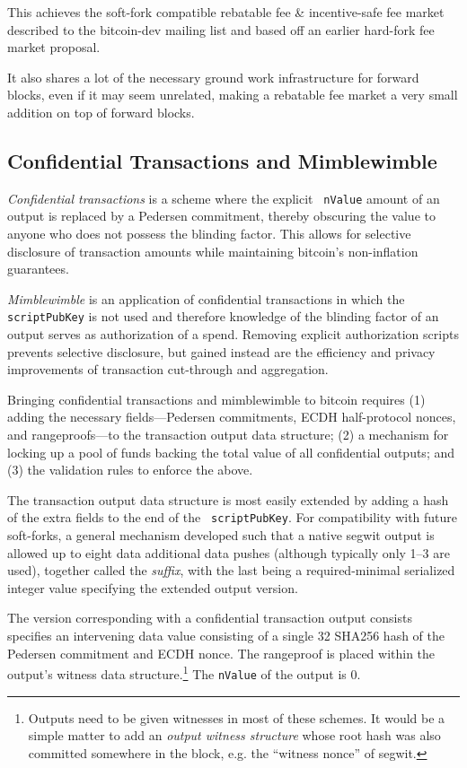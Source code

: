 This achieves the soft-fork compatible rebatable fee \& incentive-safe
fee market described to the bitcoin-dev mailing list\cite{rebatefeeml}
and based off an earlier hard-fork fee market
proposal\cite{rebatefeehf}.

It also shares a lot of the necessary ground work infrastructure for
forward blocks, even if it may seem unrelated, making a rebatable fee
market a very small addition on top of forward blocks.

\subsection{Confidential Transactions and Mimblewimble} \label{confidentialtx}

\emph{Confidential transactions} is a scheme where the explicit {\tt
  nValue} amount of an output is replaced by a Pedersen commitment,
thereby obscuring the value to anyone who does not possess the
blinding factor.  This allows for selective disclosure of transaction
amounts while maintaining bitcoin's non-inflation guarantees.

\emph{Mimblewimble} is an application of confidential transactions in
which the {\tt scriptPubKey} is not used and therefore knowledge of
the blinding factor of an output serves as authorization of a spend.
Removing explicit authorization scripts prevents selective disclosure,
but gained instead are the efficiency and privacy improvements of
transaction cut-through and aggregation.

Bringing confidential transactions and mimblewimble to bitcoin
requires (1) adding the necessary fields---Pedersen commitments, ECDH
half-protocol nonces, and rangeproofs---to the transaction output data
structure; (2) a mechanism for locking up a pool of funds backing the
total value of all confidential outputs; and (3) the validation rules
to enforce the above.

The transaction output data structure is most easily extended by
adding a hash of the extra fields to the end of the {\tt
  scriptPubKey}.  For compatibility with future soft-forks, a general
mechanism developed such that a native segwit output is allowed up to
eight data additional data pushes (although typically only
\numrange{1}{3} are used), together called the \emph{suffix}, with the
last being a required-minimal serialized integer value specifying the
extended output version.

The version corresponding with a confidential transaction output
consists specifies an intervening data value consisting of a single
\SI{32}{\byte} SHA256 hash of the Pedersen commitment and ECDH nonce.
The rangeproof is placed within the output's witness data
structure.\footnote{Outputs need to be given witnesses in most of
  these schemes.  It would be a simple matter to add an \emph{output
    witness structure} whose root hash was also committed somewhere in
  the block, e.g. the ``witness nonce'' of segwit.}  The {\tt nValue}
of the output is \SI{0}{\bitcoin}.

